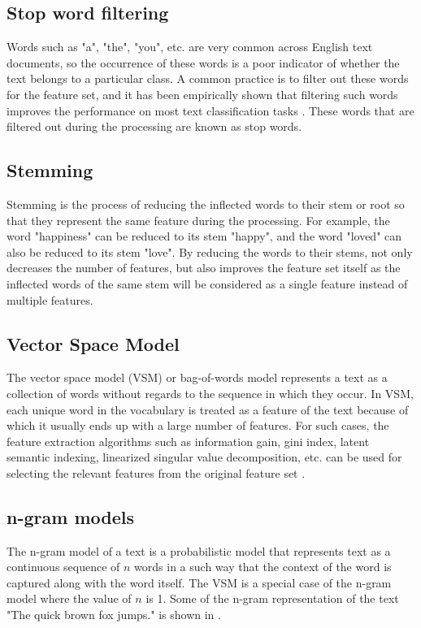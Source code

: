 \subsection{Stop word filtering}
Words such as "a", "the", "you", etc. are very common across English text documents, so the occurrence of these words is a poor indicator of whether the text belongs to a particular class. A common practice is to filter out these words for the feature set, and it has been empirically shown that filtering such words improves the performance on most text classification tasks \cite{silva2003importance}. These words that are filtered out during the processing are known as stop words. 

\subsection{Stemming}
Stemming is the process of reducing the inflected words to their stem or root so that they represent the same feature during the processing. For example, the word "happiness" can be reduced to its stem "happy", and the word "loved" can also be reduced to its stem "love". By reducing the words to their stems, not only decreases the number of features, but also improves the feature set itself  as the inflected words of the same stem will be considered as a single feature instead of multiple features. 

\subsection{Vector Space Model}
The vector space model (VSM) or bag-of-words model represents a text as a collection of words without regards to the sequence in which they occur. In VSM, each unique word in the vocabulary is treated as a feature of the text because of which it usually ends up with a large number of features. For such cases, the feature extraction algorithms such as information gain, gini index, latent semantic indexing, linearized singular value decomposition, etc. can be used for selecting the relevant features from the original feature set \cite{aggarwal2012survey}.

\subsection{n-gram models}
The n-gram model of a text is a probabilistic model that represents text as a continuous sequence of $n$ words in a such way that the context of the word is captured along with the word itself. The VSM is a special case of the n-gram model where the value of $n$ is 1. Some of the n-gram representation of the text "The quick brown fox jumps." is shown in .


